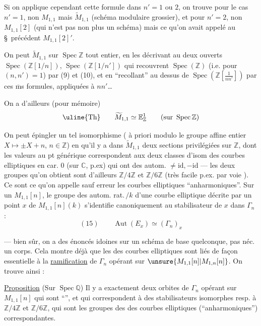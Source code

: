 Si on applique cependant cette formule dans  $n'=1$ ou $2$, on trouve pour le cas $n'=1$, non $M_{1,1}$ mais $\widetilde M_{1,1}$ (schéma modulaire grossier), et pour $n'=2$, non $M_{1,1}[2]$ (qui n'est pas non plus un schéma) mais ce qu'on avait appelé au \S\ précédent $M_{1,1}[2]'$.

On peut    $\widetilde M_{1,1}$ sur $\operatorname{Spec}\mathbb Z$ tout entier,  en les décrivant au  deux ouverts $\operatorname{Spec}(\mathbb Z[1/n])$, $\operatorname{Spec}(\mathbb Z[1/n'])$ qui recouvrent $\operatorname{Spec}(\mathbb Z)$ (i.e. pour $(n,n')=1$) par (9) et (10),  et en ``recollant''  au dessus de $\operatorname{Spec}(\mathbb Z[\frac{1}{nn'}])$ par ces $\overline{\mathrm m}$s formules, appliquées à $nn'$\ldots
{}

On a d'ailleurs (pour mémoire)
\[
\text{\uline{Th}}\qquad \widetilde M_{1,1}\simeq\mathbb E^1_{\mathbb Z}\qquad(\text{sur }\operatorname{Spec}\mathbb Z)
\]

On peut épingler un tel isomorphisme ( à priori modulo le groupe affine entier $X\longmapsto\pm X+n$, $n\in\mathbb Z$) en  qu'il y a dans $\widetilde M_{1,1}$ deux sections privilégiées sur $\mathbb Z$, dont les valeurs au pt générique correspondent aux deux classes d'isom des courbes elliptiques en car. $0$ (sur $\mathbb C$, p.ex) qui ont des autom. $\ne\mathrm{id},-\mathrm{id}$ --- les deux groupes  qu'on obtient sont d'ailleurs $\mathbb Z/4\mathbb Z$ et $\mathbb Z/6\mathbb Z$ (très facile p.ex. par voie ). Ce sont ce qu'on appelle sauf erreur les courbes elliptiques ``anharmoniques''. Sur un $M_{1,1}[n]$, le groupe des autom. rat.\,$/k$ d'une courbe elliptique décrite par un point $x$ de $M_{1,1}[n](k)$ s'identifie canoniquement au stabilisateur de $x$ dans $\Gamma_n$ :
\[
(15)\qquad\operatorname{Aut}(E_x)\simeq(\Gamma_n)_x
\]

--- bien sûr, on a des énoncés idoines sur un schéma de base quelconque, pas néc. un corps. Cela montre déjà que les  des courbes elliptiques sont liés de façon essentielle à la \uline{ramification} de $\Gamma_n$ opérant sur $\unsure{M_{1,1}[n]|M_{1,n}[n]}$. On trouve ainsi :

\uline{Proposition} (Sur $\operatorname{Spec}\mathbb Q$) Il y a exactement deux orbites de $\Gamma_n$ opérant sur $M_{1,1}[n]$ qui sont ``'', et qui correspondent à des stabilisateurs isomorphes resp. à $\mathbb Z/4\mathbb Z$ et $\mathbb Z/6\mathbb Z$, qui sont les groupes des  des courbes elliptiques (``anharmoniques'') correspondantes.

